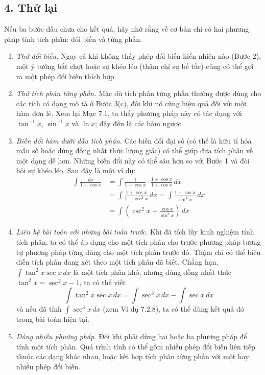 \documentclass[12pt,a4paper]{article}
\begin{document}
\subsection*{4. Thử lại}
Nếu ba bước đầu chưa cho kết quả, hãy nhớ rằng về cơ bản chỉ có hai phương pháp tính tích phân: đổi biến và từng phần.
\begin{enumerate}[label=(\alph*),leftmargin=2em]
\item \textit{Thử đổi biến.} Ngay cả khi không thấy phép đổi biến hiển nhiên nào (Bước 2), một ý tưởng bất chợt hoặc sự khéo léo (thậm chí sự bế tắc) cũng có thể gợi ra một phép đổi biến thích hợp.
\item \textit{Thử tích phân từng phần.} Mặc dù tích phân từng phần thường được dùng cho các tích có dạng mô tả ở Bước 3(c), đôi khi nó cũng hiệu quả đối với một hàm đơn lẻ. Xem lại Mục 7.1, ta thấy phương pháp này có tác dụng với $\tan^{-1}x$, $\sin^{-1}x$ và $\ln x$; đây đều là các hàm ngược.
\item \textit{Biến đổi hàm dưới dấu tích phân.} Các biến đổi đại số (có thể là hữu tỉ hóa mẫu số hoặc dùng đồng nhất thức lượng giác) có thể giúp đưa tích phân về một dạng dễ hơn. Những biến đổi này có thể sâu hơn so với Bước 1 và đòi hỏi sự khéo léo. Sau đây là một ví dụ:
\begin{align*}
\int\frac{dx}{1-\cos x}
&=\int\frac1{1-\cos x}\cdot\frac{1+\cos x}{1+\cos x}\,dx\\
&=\int\frac{1+\cos x}{1-\cos^2x}\,dx
=\int\frac{1+\cos x}{\sin^2x}\,dx\\
&=\int\left(\csc^2x+\frac{\cos x}{\sin^2x}\right)\,dx
\end{align*}
\item \textit{Liên hệ bài toán với những bài toán trước.} Khi đã tích lũy kinh nghiệm tính tích phân, ta có thể áp dụng cho một tích phân cho trước phương pháp tương tự phương pháp từng dùng cho một tích phân trước đó. Thậm chí có thể biểu diễn tích phân đang xét theo một tích phân đã biết. Chẳng hạn, $\int\tan^2x\sec x\,dx$ là một tích phân khó, nhưng dùng đồng nhất thức $\tan^2x=\sec^2x-1$, ta có thể viết
\[\int\tan^2x\sec x\,dx=\int\sec^3x\,dx-\int\sec x\,dx\]
và nếu đã tính $\int\sec^3x\,dx$ (xem Ví dụ 7.2.8), ta có thể dùng kết quả đó trong bài toán hiện tại.
\item \textit{Dùng nhiều phương pháp.} Đôi khi phải dùng hai hoặc ba phương pháp để tính một tích phân. Quá trình tính có thể gồm nhiều phép đổi biến liên tiếp thuộc các dạng khác nhau, hoặc kết hợp tích phân từng phần với một hay nhiều phép đổi biến.
\end{enumerate}
\end{document}
